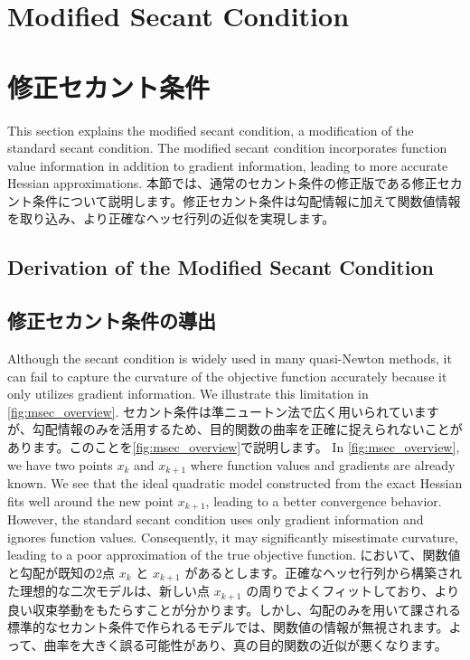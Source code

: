 \documentclass[0_main]{subfiles}
\begin{document}
\ifEn
    \section{Modified Secant Condition}
\else
    \section{修正セカント条件}
\fi
\label{sec:background_modified_secant}

\ifEn
    This section explains the modified secant condition, a modification of the standard secant condition. The modified secant condition incorporates function value information in addition to gradient information, leading to more accurate Hessian approximations.
\else
    本節では、通常のセカント条件の修正版である修正セカント条件について説明します。修正セカント条件は勾配情報に加えて関数値情報を取り込み、より正確なヘッセ行列の近似を実現します。
\fi

\ifEn
    \subsection{Derivation of the Modified Secant Condition}
\else
    \subsection{修正セカント条件の導出}
\fi

\ifEn
    Although the secant condition is widely used in many quasi-Newton methods, it can fail to capture the curvature of the objective function accurately because it only utilizes gradient information. We illustrate this limitation in \cref{fig:msec_overview}.
\else
    セカント条件は準ニュートン法で広く用いられていますが、勾配情報のみを活用するため、目的関数の曲率を正確に捉えられないことがあります。このことを\cref{fig:msec_overview}で説明します。
\fi
\ifEn
    In \cref{fig:msec_overview}, we have two points $x_k$ and $x_{k+1}$ where function values and gradients are already known. We see that the ideal quadratic model constructed from the exact Hessian fits well around the new point $x_{k+1}$, leading to a better convergence behavior. However, the standard secant condition uses only gradient information and ignores function values. Consequently, it may significantly misestimate curvature, leading to a poor approximation of the true objective function.
\else
     において、関数値と勾配が既知の2点 $x_k$ と $x_{k+1}$ があるとします。正確なヘッセ行列から構築された理想的な二次モデルは、新しい点 $x_{k+1}$ の周りでよくフィットしており、より良い収束挙動をもたらすことが分かります。しかし、勾配のみを用いて課される標準的なセカント条件で作られるモデルでは、関数値の情報が無視されます。よって、曲率を大きく誤る可能性があり、真の目的関数の近似が悪くなります。
\fi
\end{document}
